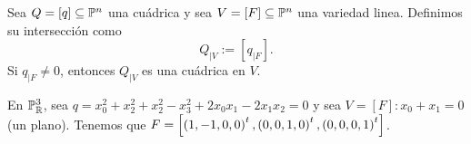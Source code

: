 

\begin{defi}
    Sea $Q= \left[ q \right] \subseteq \mathbb{P} ^n$ una cuádrica y sea $V = \left[ F \right] \subseteq \mathbb{P} ^n$ una variedad linea. Definimos su intersección como
    \[
        Q_{|V} := \left[q_{|F} \right].
    \]
    Si $q_{|F} \neq 0$, entonces $Q_{|V}$ es una cuádrica en $V$.
\end{defi}

\begin{example}
    En $\mathbb{P} _{\mathbb{R}} ^3$, sea $q=x_0^2+x_2^2+x_2^2-x_3^2+2x_0x_1-2x_1x_2=0$ y sea $V=\left[ F \right] \colon x_0+x_1=0$ (un plano). Tenemos que $F=\left[ \left( 1, -1, 0, 0 \right) ^t, \left( 0, 0, 1, 0 \right) ^t, \left( 0, 0, 0, 1 \right) ^t \right]$.
\end{example}
